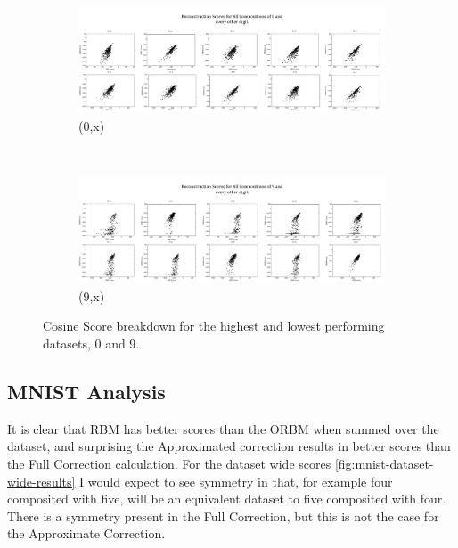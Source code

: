     \begin{figure}[h]
    \centering
    \begin{subfigure}[t]{1.1\textwidth}
        \includegraphics[width=\textwidth]{Assets/(0,X)-ReconstructionScores.png}
        \caption{(0,x)}
        \label{F:Cosine-0-x-scores}
    \end{subfigure}
    ~ %
    \begin{subfigure}[t]{1.1\textwidth}
        \includegraphics[width=\textwidth]{Assets/(9,X)-ReconstructionScores.png}
        \caption{(9,x)}
        \label{F:Cosine-9-x-scores}
    \end{subfigure}
    \caption{Cosine Score breakdown for the highest and lowest performing datasets, 0 and 9.}\label{fig:mnist-worse-best-results}
\end{figure}


\subsection{MNIST Analysis}

It is clear that RBM has better scores than the ORBM when summed over the dataset, and surprising the Approximated correction results in better scores than the Full Correction calculation. For the dataset wide scores \ref{fig:mnist-dataset-wide-results} I would expect to see symmetry in that, for example four composited with five, will be an equivalent dataset to five composited with four. There is a symmetry present in the Full Correction, but this is not the case for the Approximate Correction.



